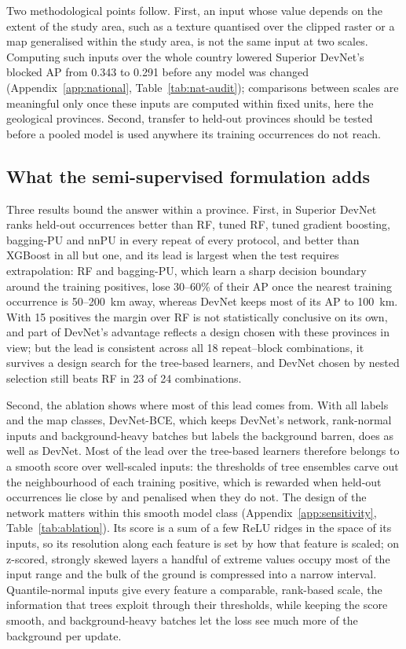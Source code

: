 \documentclass[pdflatex,sn-apa]{sn-jnl}
\begin{document}
Two methodological points follow. First, an input whose value depends on the extent of the study area, such as a texture quantised over the clipped raster or a map generalised within the study area, is not the same input at two scales. Computing such inputs over the whole country lowered Superior DevNet's blocked AP from 0.343 to 0.291 before any model was changed (Appendix~\ref{app:national}, Table~\ref{tab:nat-audit}); comparisons between scales are meaningful only once these inputs are computed within fixed units, here the geological provinces. Second, transfer to held-out provinces should be tested before a pooled model is used anywhere its training occurrences do not reach.

\subsection{What the semi-supervised formulation adds}\label{sec:disc-devnet}

Three results bound the answer within a province. First, in Superior DevNet ranks held-out occurrences better than RF, tuned RF, tuned gradient boosting, bagging-PU and nnPU in every repeat of every protocol, and better than XGBoost in all but one, and its lead is largest when the test requires extrapolation: RF and bagging-PU, which learn a sharp decision boundary around the training positives, lose 30--60\% of their AP once the nearest training occurrence is 50--200~km away, whereas DevNet keeps most of its AP to 100~km. With 15 positives the margin over RF is not statistically conclusive on its own, and part of DevNet's advantage reflects a design chosen with these provinces in view; but the lead is consistent across all 18 repeat--block combinations, it survives a design search for the tree-based learners, and DevNet chosen by nested selection still beats RF in 23 of 24 combinations.

Second, the ablation shows where most of this lead comes from. With all labels and the map classes, DevNet-BCE, which keeps DevNet's network, rank-normal inputs and background-heavy batches but labels the background barren, does as well as DevNet. Most of the lead over the tree-based learners therefore belongs to a smooth score over well-scaled inputs: the thresholds of tree ensembles carve out the neighbourhood of each training positive, which is rewarded when held-out occurrences lie close by and penalised when they do not. The design of the network matters within this smooth model class (Appendix~\ref{app:sensitivity}, Table~\ref{tab:ablation}). Its score is a sum of a few ReLU ridges in the space of its inputs, so its resolution along each feature is set by how that feature is scaled; on z-scored, strongly skewed layers a handful of extreme values occupy most of the input range and the bulk of the ground is compressed into a narrow interval. Quantile-normal inputs give every feature a comparable, rank-based scale, the information that trees exploit through their thresholds, while keeping the score smooth, and background-heavy batches let the loss see much more of the background per update.
\end{document}

